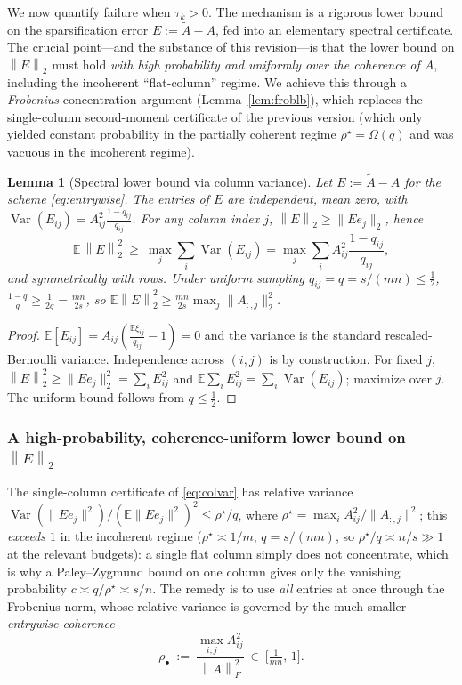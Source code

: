 \documentclass{amsart}
\newtheorem{lemma}{Lemma}
\theoremstyle{definition}
\DeclareMathOperator{\Var}{Var}
\newcommand{\Frob}[1]{\left\lVert #1\right\rVert_F}
\newcommand{\Op}[1]{\left\lVert #1\right\rVert_2}
\newcommand{\Atil}{\widetilde{A}}
\newcommand{\E}{\mathbb{E}}
\begin{document}
We now quantify failure when $\tau_k>0$. The mechanism is a rigorous lower bound
on the sparsification error $E:=\Atil-A$, fed into an elementary spectral
certificate. The crucial point---and the substance of this revision---is that the
lower bound on $\Op E$ must hold \emph{with high probability and uniformly over
the coherence of $A$}, including the incoherent ``flat-column'' regime. We achieve
this through a \emph{Frobenius} concentration argument (Lemma~\ref{lem:froblb}),
which replaces the single-column second-moment certificate of the previous
version (which only yielded constant probability in the partially coherent regime
$\rho^\star=\Omega(q)$ and was vacuous in the incoherent regime).

\begin{lemma}[Spectral lower bound via column variance]\label{lem:colvar}
Let $E:=\Atil-A$ for the scheme \eqref{eq:entrywise}. The entries of $E$ are
independent, mean zero, with $\Var(E_{ij})=A_{ij}^2\frac{1-q_{ij}}{q_{ij}}$.
For any column index $j$, $\Op E\ge\|E e_j\|_2$, hence
\begin{equation}\label{eq:colvar}
\E\,\Op E^2\ \ge\ \max_j\sum_i\Var(E_{ij})
=\max_j\sum_i A_{ij}^2\frac{1-q_{ij}}{q_{ij}},
\end{equation}
and symmetrically with rows. Under uniform sampling $q_{ij}=q=s/(mn)\le\tfrac12$,
$\frac{1-q}{q}\ge\frac{1}{2q}=\frac{mn}{2s}$, so
$\E\Op E^2\ge\frac{mn}{2s}\max_j\|A_{:,j}\|_2^2$.
\end{lemma}

\begin{proof}
$\E[E_{ij}]=A_{ij}(\frac{\E\xi_{ij}}{q_{ij}}-1)=0$ and the variance is the
standard rescaled-Bernoulli variance. Independence across $(i,j)$ is by
construction. For fixed $j$, $\Op E^2\ge\|Ee_j\|_2^2=\sum_iE_{ij}^2$ and
$\E\sum_iE_{ij}^2=\sum_i\Var(E_{ij})$; maximize over $j$. The uniform bound
follows from $q\le\tfrac12$.
\end{proof}

\subsubsection*{A high-probability, coherence-uniform lower bound on $\Op E$}

The single-column certificate of \eqref{eq:colvar} has relative variance
$\Var(\|Ee_j\|^2)/(\E\|Ee_j\|^2)^2\le\rho^\star/q$, where
$\rho^\star=\max_iA_{ij}^2/\|A_{:,j}\|^2$; this \emph{exceeds $1$} in the
incoherent regime ($\rho^\star\asymp1/m$, $q=s/(mn)$, so
$\rho^\star/q\asymp n/s\gg1$ at the relevant budgets): a single flat column
simply does not concentrate, which is why a Paley--Zygmund bound on one column
gives only the vanishing probability $c\asymp q/\rho^\star\asymp s/n$. The remedy
is to use \emph{all} entries at once through the Frobenius norm, whose relative
variance is governed by the much smaller \emph{entrywise coherence}
\begin{equation}\label{eq:rhobullet}
\rho_\bullet\ :=\ \frac{\max_{i,j}A_{ij}^2}{\Frob A^2}\ \in\ \Big[\tfrac1{mn},\,1\Big].
\end{equation}
\end{document}
